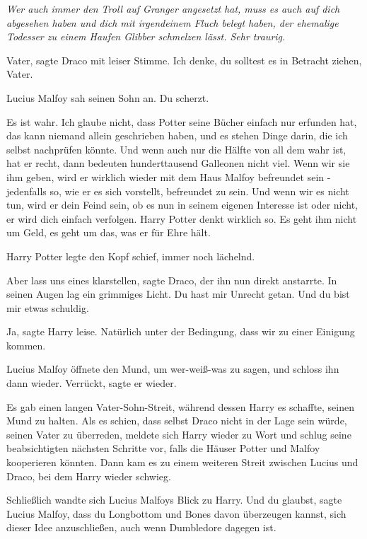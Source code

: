 \emph{Wer auch immer den Troll auf Granger angesetzt hat, muss es auch auf dich
abgesehen haben und dich mit irgendeinem Fluch belegt haben, der ehemalige
Todesser zu einem Haufen Glibber schmelzen lässt. Sehr traurig.}

\glqq{}Vater\grqq{}, sagte Draco mit leiser Stimme. \glqq{}Ich denke, du solltest
es in Betracht ziehen, Vater.\grqq{}

Lucius Malfoy sah seinen Sohn an. \glqq{}Du scherzt.\grqq{}

\glqq{}Es ist wahr. Ich glaube nicht, dass Potter seine Bücher einfach nur
erfunden hat, das kann niemand allein geschrieben haben, und es stehen Dinge
darin, die ich selbst nachprüfen könnte. Und wenn auch nur die Hälfte von all
dem wahr ist, hat er recht, dann bedeuten hunderttausend Galleonen nicht viel.
Wenn wir sie ihm geben, wird er wirklich wieder mit dem Haus Malfoy befreundet
sein - jedenfalls so, wie er es sich vorstellt, befreundet zu sein. Und wenn wir
es nicht tun, wird er dein Feind sein, ob es nun in seinem eigenen Interesse ist
oder nicht, er wird dich einfach verfolgen. Harry Potter denkt wirklich so. Es
geht ihm nicht um Geld, es geht um das, was er für Ehre hält.\grqq{}

Harry Potter legte den Kopf schief, immer noch lächelnd.

\glqq{}Aber lass uns eines klarstellen\grqq{}, sagte Draco, der ihn nun direkt
anstarrte. In seinen Augen lag ein grimmiges Licht. \glqq{}Du hast mir Unrecht
getan. Und du bist mir etwas schuldig.\grqq{}

\glqq{}Ja\grqq{}, sagte Harry leise. \glqq{}Natürlich unter der Bedingung, dass
wir zu einer Einigung kommen.\grqq{}

Lucius Malfoy öffnete den Mund, um wer-weiß-was zu sagen, und schloss ihn dann
wieder. \glqq{}Verrückt\grqq{}, sagte er wieder.

Es gab einen langen Vater-Sohn-Streit, während dessen Harry es schaffte, seinen
Mund zu halten. Als es schien, dass selbst Draco nicht in der Lage sein würde,
seinen Vater zu überreden, meldete sich Harry wieder zu Wort und schlug seine
beabsichtigten nächsten Schritte vor, falls die Häuser Potter und Malfoy
kooperieren könnten. Dann kam es zu einem weiteren Streit zwischen Lucius und
Draco, bei dem Harry wieder schwieg.

Schließlich wandte sich Lucius Malfoys Blick zu Harry. \glqq{}Und du
glaubst\grqq{}, sagte Lucius Malfoy, \glqq{}dass du Longbottom und Bones davon
überzeugen kannst, sich dieser Idee anzuschließen, auch wenn Dumbledore dagegen
ist.\grqq{}

